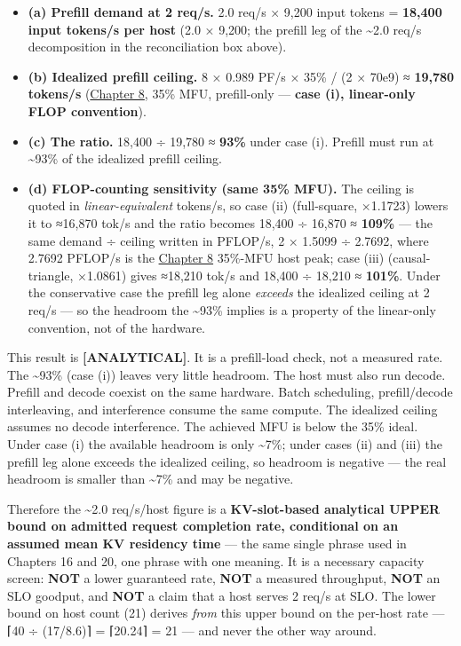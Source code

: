 \begin{itemize}
\tightlist
\item
  \textbf{(a) Prefill demand at 2 req/s.} 2.0 req/s × 9,200 input tokens
  = \textbf{18,400 input tokens/s per host} (2.0 × 9,200; the prefill
  leg of the \textasciitilde2.0 req/s decomposition in the
  reconciliation box above).
\item
  \textbf{(b) Idealized prefill ceiling.} 8 × 0.989 PF/s × 35\% / (2 ×
  70e9) ≈ \textbf{19,780 tokens/s} (\hyperref[chap:8]{Chapter 8}, 35\% MFU, prefill-only
  --- \textbf{case (i), linear-only FLOP convention}).
\item
  \textbf{(c) The ratio.} 18,400 ÷ 19,780 ≈ \textbf{93\%} under case
  (i). Prefill must run at \textasciitilde93\% of the idealized prefill
  ceiling.
\item
  \textbf{(d) FLOP-counting sensitivity (same 35\% MFU).} The ceiling is
  quoted in \emph{linear-equivalent} tokens/s, so case (ii)
  (full-square, ×1.1723) lowers it to ≈16,870 tok/s and the ratio
  becomes 18,400 ÷ 16,870 ≈ \textbf{109\%} --- the same demand ÷ ceiling
  written in PFLOP/s, 2 × 1.5099 ÷ 2.7692, where 2.7692 PFLOP/s is the
  \hyperref[chap:8]{Chapter 8} 35\%-MFU host peak; case (iii) (causal-triangle, ×1.0861)
  gives ≈18,210 tok/s and 18,400 ÷ 18,210 ≈ \textbf{101\%}. Under the
  conservative case the prefill leg alone \emph{exceeds} the idealized
  ceiling at 2 req/s --- so the headroom the \textasciitilde93\% implies
  is a property of the linear-only convention, not of the hardware.
\end{itemize}

This result is \textbf{\mbox{{[}ANALYTICAL{]}}}. It is a prefill-load check,
not a measured rate. The \textasciitilde93\% (case (i)) leaves very
little headroom. The host must also run decode. Prefill and decode
coexist on the same hardware. Batch scheduling, prefill/decode
interleaving, and interference consume the same compute. The idealized
ceiling assumes no decode interference. The achieved MFU is below the
35\% ideal. Under case (i) the available headroom is only
\textasciitilde7\%; under cases (ii) and (iii) the prefill leg alone
exceeds the idealized ceiling, so headroom is negative --- the real
headroom is smaller than \textasciitilde7\% and may be negative.

Therefore the \textasciitilde2.0 req/s/host figure is a
\textbf{KV-slot-based analytical UPPER bound on admitted request
completion rate, conditional on an assumed mean KV residency time} ---
the same single phrase used in Chapters 16 and 20, one phrase with one
meaning. It is a necessary capacity screen: \textbf{NOT} a lower
guaranteed rate, \textbf{NOT} a measured throughput, \textbf{NOT} an SLO
goodput, and \textbf{NOT} a claim that a host serves 2 req/s at SLO. The
lower bound on host count (21) derives \emph{from} this upper bound on
the per-host rate --- ⌈40 ÷ (17/8.6)⌉ = ⌈20.24⌉ = 21 --- and never the
other way around.

